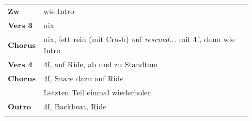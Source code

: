 \begin{tabular}{p{1.6cm}l}
	\textbf{Zw}     & wie Intro                                                                  \\
	\textbf{Vers 3} & nix                                                                        \\
	\textbf{Chorus} & nix, fett rein (mit Crash) auf \textit{rescued...} mit 4f, dann wie Intro  \\
	\textbf{Vers 4} & 4f, auf Ride, ab und zu Standtom                                           \\
	\textbf{Chorus} & 4f, Snare dazu auf Ride                                                    \\
	                & Letzten Teil einmal wiederholen                                            \\
	\textbf{Outro}  & 4f, Backbeat, Ride                                                         \\
	                &                                                                            \\
\end{tabular}